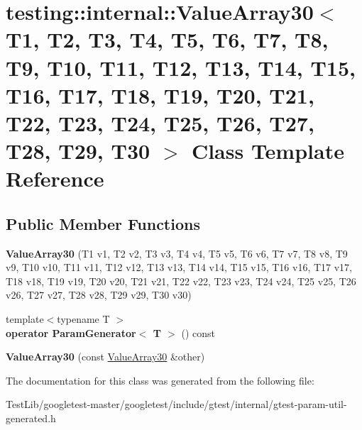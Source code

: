 \hypertarget{classtesting_1_1internal_1_1ValueArray30}{}\section{testing\+:\+:internal\+:\+:Value\+Array30$<$ T1, T2, T3, T4, T5, T6, T7, T8, T9, T10, T11, T12, T13, T14, T15, T16, T17, T18, T19, T20, T21, T22, T23, T24, T25, T26, T27, T28, T29, T30 $>$ Class Template Reference}
\label{classtesting_1_1internal_1_1ValueArray30}
\subsection*{Public Member Functions}
\begin{DoxyCompactItemize}
\item 
\mbox{\label{classtesting_1_1internal_1_1ValueArray30_a8a8f06de5be33b14b9af3593eec9ebc0}} 
{\bfseries Value\+Array30} (T1 v1, T2 v2, T3 v3, T4 v4, T5 v5, T6 v6, T7 v7, T8 v8, T9 v9, T10 v10, T11 v11, T12 v12, T13 v13, T14 v14, T15 v15, T16 v16, T17 v17, T18 v18, T19 v19, T20 v20, T21 v21, T22 v22, T23 v23, T24 v24, T25 v25, T26 v26, T27 v27, T28 v28, T29 v29, T30 v30)
\item 
\mbox{\label{classtesting_1_1internal_1_1ValueArray30_a95aea52bbac9717aedd7432f2b719f77}} 
{\footnotesize template$<$typename T $>$ }\\{\bfseries operator Param\+Generator$<$ T $>$} () const
\item 
\mbox{\label{classtesting_1_1internal_1_1ValueArray30_af27a2f6c2dea95facfbf7e2729f602c2}} 
{\bfseries Value\+Array30} (const \hyperlink{classtesting_1_1internal_1_1ValueArray30}{Value\+Array30} \&other)
\end{DoxyCompactItemize}


The documentation for this class was generated from the following file\+:\begin{DoxyCompactItemize}
\item 
Test\+Lib/googletest-\/master/googletest/include/gtest/internal/gtest-\/param-\/util-\/generated.\+h\end{DoxyCompactItemize}
